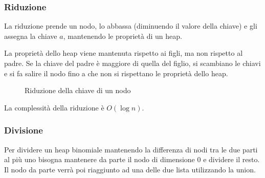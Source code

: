 \documentclass[a4paper]{article}
\begin{document}
\subsubsection{Riduzione}
La riduzione prende un nodo, lo abbassa (diminuendo il valore della chiave) e gli assegna
la chiave \( a \), mantenendo le proprietà di un heap.

La proprietà dello heap viene mantenuta rispetto ai figli, ma non rispetto al padre. Se
la chiave del padre è maggiore di quella del figlio, si scambiano le chiavi e si fa
salire il nodo fino a che non si rispettano le proprietà dello heap.

\begin{figure}[H]
  \centering
  \caption{Riduzione della chiave di un nodo}
\end{figure}

\noindent
La complessità della riduzione è \( O(\log n) \).

\subsubsection{Divisione}
Per dividere un heap binomiale mantenendo la differenza di nodi tra le due parti al più
uno bisogna mantenere da parte il nodo di dimensione 0 e dividere il resto. Il nodo
da parte verrà poi riaggiunto ad una delle due lista utilizzando la union.
\end{document}
